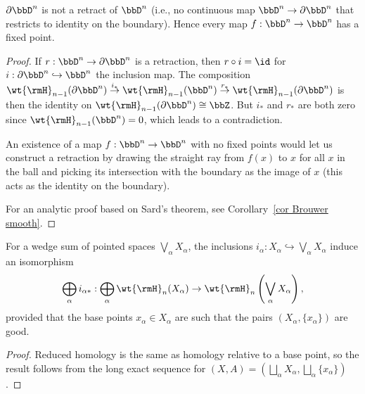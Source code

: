 \begin{cor}\label{cor Brouwer homology}
    $\partial \bbD^n$ is not a retract of $\bbD^n$ (i.e., no continuous map $\bbD^n\to \partial \bbD^n$ that restricts to identity on the boundary). Hence every map $f:\bbD^n\to \bbD^n$ has a fixed point.
\end{cor}
\begin{proof}
     If $r:\bbD^n\to \partial \bbD^n$ is a retraction, then $r\circ i=\id$ for $i:\partial \bbD^n\hookrightarrow \bbD^n$ the inclusion map. The composition $\wt{\rmH}_{n-1}(\partial \bbD^n)\overset{i_\ast}\to \wt{\rmH}_{n-1}(\bbD^n)\overset{r_\ast}\to \wt{\rmH}_{n-1}(\partial \bbD^n)$ is then the identity on $\wt{\rmH}_{n-1}(\partial \bbD^n)\cong \bbZ$. But $i_\ast$ and $r_\ast$ are both zero since $\wt{\rmH}_{n-1}(\bbD^n)=0$, which leads to a contradiction.
     
     An existence of a map $f:\bbD^n\to \bbD^n$ with no fixed points would let us construct a retraction by drawing the straight ray from $f(x)$ to $x$ for all $x$ in the ball and picking its intersection with the boundary as the image of $x$ (this acts as the identity on the boundary).

     For an analytic proof based on Sard's theorem, see Corollary~\ref{cor Brouwer smooth}.
\end{proof}



\begin{cor}
    For a wedge sum of pointed spaces $\bigvee_{\alpha}X_\alpha$, the inclusions $i_\alpha:X_\alpha\hookrightarrow \bigvee_{\alpha}X_\alpha$ induce an isomorphism 
    \[\bigoplus_\alpha i_{\alpha\ast}:\bigoplus_\alpha\wt{\rmH}_n(X_\alpha)\to \wt{\rmH}_n\left(\bigvee_{\alpha}X_\alpha\right),\]
    provided that the base points $x_\alpha\in X_\alpha$ are such that the pairs $(X_\alpha,\{x_\alpha\})$ are good.
\end{cor}
\begin{proof}
     Reduced homology is the same as homology relative to a base point, so the result follows from the long exact sequence for $(X,A)=\left(\bigsqcup_\alpha X_\alpha, \bigsqcup_\alpha \{x_\alpha\}\right)$.
\end{proof}

